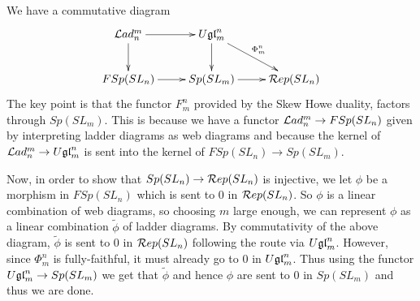\documentclass[11pt,leqno]{article}
\begin{document}
We have a commutative diagram
\begin{equation*}
\xymatrix{
\Lad_n^m \ar[r] \ar[d] & \Ugl{m}^n \ar[dr]^{\Phi_m^n} \ar[d] & \\
FSp(SL_n) \ar[r] & Sp(SL_m) \ar[r] & \RepSL{n} \\
}
\end{equation*}
The key point is that the functor $ F_m^n $ provided by the Skew Howe duality, factors through $ Sp(SL_m)$.  This is because we have a functor $ \mathcal{L}ad_n^m \rightarrow FSp(SL_n) $ given by interpreting ladder diagrams as web diagrams and because the kernel of $ \mathcal{L}ad_n^m \rightarrow U\mathfrak{gl}_{m}^n $ is sent into the kernel of $ FSp(SL_n) \rightarrow Sp(SL_m) $.  

Now, in order to show that $ Sp(SL_n) \rightarrow \mathcal{R}ep(SL_{n}) $ is injective, we let $ \phi $ be a morphism in $ FSp(SL_n)$ which is sent to 0 in $ \mathcal{R}ep(SL_{n}) $.  So $ \phi $ is a linear combination of web diagrams, so choosing $m$ large enough, we can represent $ \phi $ as a linear combination $ \tilde{\phi} $ of ladder diagrams.   By commutativity of the above diagram, $ \tilde{\phi} $ is sent to 0 in $ \mathcal{R}ep(SL_{n}) $ following the route via $ U\mathfrak{gl}_{m}^n $.  However, since $ \Phi_m^n $ is fully-faithful, it must already go to 0 in $ U\mathfrak{gl}_{m}^n $.  Thus using the functor $ U\mathfrak{gl}_{m}^n \rightarrow Sp(SL_m) $ we get that $ \tilde{\phi} $ and hence $ \phi $ are sent to 0 in $ Sp(SL_m) $ and thus we are done.





\end{document}
